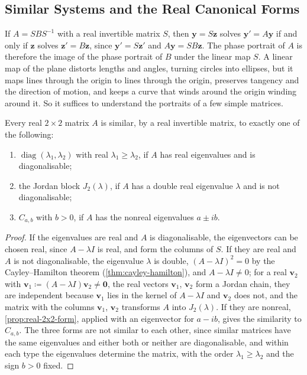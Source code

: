 \subsection{Similar Systems and the Real Canonical Forms}

If $A=SBS^{-1}$ with a real invertible matrix $S$, then $\mathbf y=S\mathbf z$ solves $\mathbf y'=A\mathbf y$ if and only if $\mathbf z$ solves $\mathbf z'=B\mathbf z$, since $\mathbf y'=S\mathbf z'$ and $A\mathbf y=SB\mathbf z$. The phase portrait of $A$ is therefore the image of the phase portrait of $B$ under the linear map $S$. A linear map of the plane distorts lengths and angles, turning circles into ellipses, but it maps lines through the origin to lines through the origin, preserves tangency and the direction of motion, and keeps a curve that winds around the origin winding around it. So it suffices to understand the portraits of a few simple matrices.

\begin{proposition}
\label{prop:real-forms-2x2}
Every real $2\times2$ matrix $A$ is similar, by a real invertible matrix, to exactly one of the following:
\begin{enumerate}
\item $\operatorname{diag}(\lambda_1,\lambda_2)$ with real $\lambda_1\ge\lambda_2$, if $A$ has real eigenvalues and is diagonalisable;
\item the Jordan block $J_2(\lambda)$, if $A$ has a double real eigenvalue $\lambda$ and is not diagonalisable;
\item $C_{a,b}$ with $b>0$, if $A$ has the nonreal eigenvalues $a\pm ib$.
\end{enumerate}
\end{proposition}

\begin{proof}
If the eigenvalues are real and $A$ is diagonalisable, the eigenvectors can be chosen real, since $A-\lambda I$ is real, and form the columns of $S$. If they are real and $A$ is not diagonalisable, the eigenvalue $\lambda$ is double, $(A-\lambda I)^2=0$ by the Cayley--Hamilton theorem (\cref{thm:cayley-hamilton}), and $A-\lambda I\ne0$; for a real $\mathbf v_2$ with $\mathbf v_1\coloneqq(A-\lambda I)\mathbf v_2\ne\mathbf 0$, the real vectors $\mathbf v_1$, $\mathbf v_2$ form a Jordan chain, they are independent because $\mathbf v_1$ lies in the kernel of $A-\lambda I$ and $\mathbf v_2$ does not, and the matrix with the columns $\mathbf v_1$, $\mathbf v_2$ transforms $A$ into $J_2(\lambda)$. If they are nonreal, \cref{prop:real-2x2-form}, applied with an eigenvector for $a-ib$, gives the similarity to $C_{a,b}$. The three forms are not similar to each other, since similar matrices have the same eigenvalues and either both or neither are diagonalisable, and within each type the eigenvalues determine the matrix, with the order $\lambda_1\ge\lambda_2$ and the sign $b>0$ fixed.
\end{proof}

